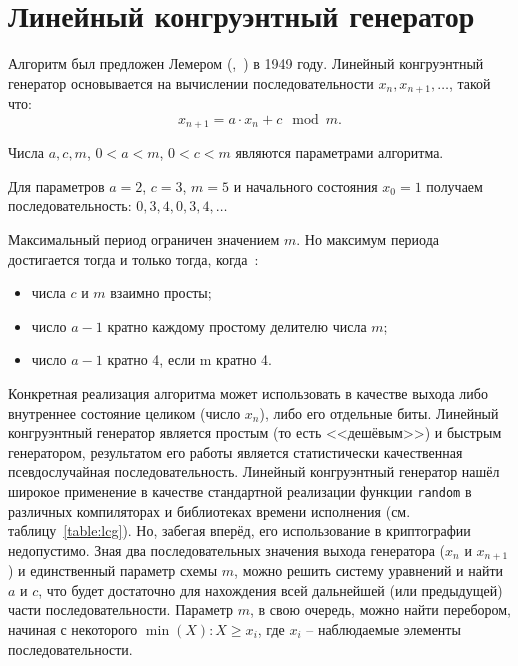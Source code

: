 \section{Линейный конгруэнтный генератор}\label{section-linear-congruential-generator}

Алгоритм был предложен Лемером (,~\cite{Lehmer:1951:1, Lehmer:1951:2}) в 1949 году. Линейный конгруэнтный генератор основывается на вычислении последовательности $x_n, x_{n+1}, \dots$, такой что:
	\[x_{n+1} = a \cdot x_n + c \mod m.\]

Числа $a, c, m$, $0 < a < m$, $0 < c < m$ являются параметрами алгоритма.

\example
Для параметров $a = 2$, $c = 3$, $m = 5$ и начального состояния $x_0 = 1$ получаем последовательность: $0, 3, 4, 0, 3, 4, \dots$
\exampleend

Максимальный период ограничен значением $m$. Но максимум периода достигается тогда и только тогда, когда~\cite[Линейный конгруэнтный метод]{Knuth:2001:2}:

\begin{itemize}
	\item числа $c$ и $m$ взаимно просты;
	\item число $a - 1$ кратно каждому простому делителю числа $m$;
	\item число $a - 1$ кратно 4, если m кратно 4.
\end{itemize}

Конкретная реализация алгоритма может использовать в качестве выхода либо внутреннее состояние целиком (число $x_n$), либо его отдельные биты. Линейный конгруэнтный генератор является простым (то есть <<дешёвым>>) и быстрым генератором, результатом его работы является статистически качественная псевдослучайная последовательность. Линейный конгруэнтный генератор нашёл широкое применение в качестве стандартной реализации функции \texttt{random} в различных компиляторах и библиотеках времени исполнения (см. таблицу~\ref{table:lcg}). Но, забегая вперёд, его использование в криптографии недопустимо. Зная два последовательных значения выхода генератора ($x_n$ и $x_{n+1}$) и единственный параметр схемы $m$, можно решить систему уравнений и найти $a$ и $c$, что будет достаточно для нахождения всей дальнейшей (или предыдущей) части последовательности. Параметр $m$, в свою очередь, можно найти перебором, начиная с некоторого $\min(X): X \geq x_i$, где $x_i$ -- наблюдаемые элементы последовательности.

